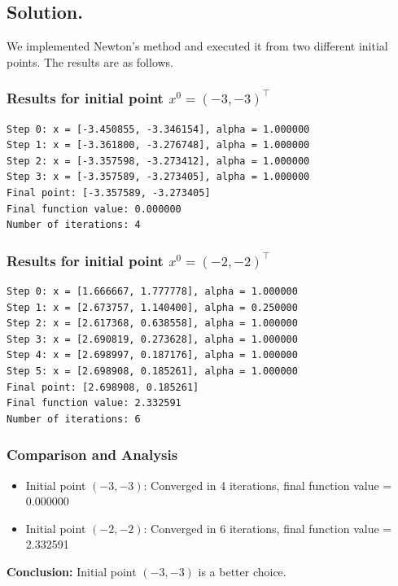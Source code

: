 \documentclass[11pt]{article}
\begin{document}
\begin{enumerate}
\subsection*{Solution.}

We implemented Newton's method and executed it from two different initial points. The results are as follows.

\subsubsection*{Results for initial point $x^0 = (-3, -3)^\top$}

\begin{verbatim}
Step 0: x = [-3.450855, -3.346154], alpha = 1.000000
Step 1: x = [-3.361800, -3.276748], alpha = 1.000000
Step 2: x = [-3.357598, -3.273412], alpha = 1.000000
Step 3: x = [-3.357589, -3.273405], alpha = 1.000000
Final point: [-3.357589, -3.273405]
Final function value: 0.000000
Number of iterations: 4
\end{verbatim}

\subsubsection*{Results for initial point $x^0 = (-2, -2)^\top$}

\begin{verbatim}
Step 0: x = [1.666667, 1.777778], alpha = 1.000000
Step 1: x = [2.673757, 1.140400], alpha = 0.250000
Step 2: x = [2.617368, 0.638558], alpha = 1.000000
Step 3: x = [2.690819, 0.273628], alpha = 1.000000
Step 4: x = [2.698997, 0.187176], alpha = 1.000000
Step 5: x = [2.698908, 0.185261], alpha = 1.000000
Final point: [2.698908, 0.185261]
Final function value: 2.332591
Number of iterations: 6
\end{verbatim}

\subsubsection*{Comparison and Analysis}

\begin{itemize}
    \item Initial point $(-3, -3)$: Converged in 4 iterations, final function value = 0.000000
    \item Initial point $(-2, -2)$: Converged in 6 iterations, final function value = 2.332591
\end{itemize}

\textbf{Conclusion:} Initial point $(-3, -3)$ is a better choice.


\end{enumerate}
\end{document}
